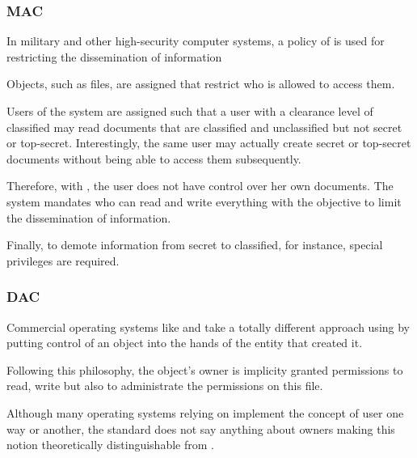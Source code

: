 \begin{frame}
  \frametitle{MAC}

  In military and other high-security computer systems, a policy of
   is used for restricting the
  dissemination of information

  \-

  Objects, such as files, are assigned  that restrict who
  is allowed to access them.

  \-

  Users of the system are assigned  such that a user
  with a clearance level of classified may read documents that are classified
  and unclassified but not secret or top-secret. Interestingly, the same user
  may actually create secret or top-secret documents without being able to
  access them subsequently.

  \-

  Therefore, with , the user does not have control over her own
  documents. The system mandates who can read and write everything with the
  objective to limit the dissemination of information.

  \-

  Finally, to demote information from secret to classified, for instance,
  special privileges are required.
\end{frame}


\begin{frame}
  \frametitle{DAC}

  Commercial operating systems like  and  take a
  totally different approach using  by putting control of an object into the hands of the entity
  that created it.

  \-

  Following this philosophy, the object's owner is implicity granted
  permissions to read, write but also to administrate the permissions on
  this file.

  \-

  Although many operating systems relying on  implement the concept
  of user one way or another, the standard does not say anything about
  owners making this notion theoretically distinguishable from .
\end{frame}


